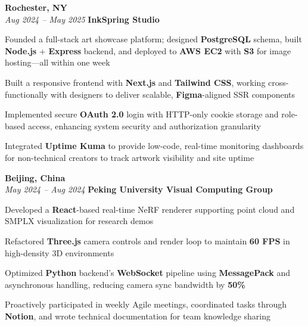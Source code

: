 \begin{twocolentry}{
    \textbf{Rochester, NY} \\
    \textit{Aug 2024 – May 2025}
}{
    \textbf{InkSpring Studio} \\
}
\end{twocolentry}
\begin{onecolentry}
    \begin{highlights}
        \item Founded a full-stack art showcase platform; designed \textbf{PostgreSQL} schema, built \textbf{Node.js} + \textbf{Express} backend, and deployed to \textbf{AWS EC2} with \textbf{S3} for image hosting—all within one week
        \item Built a responsive frontend with \textbf{Next.js} and \textbf{Tailwind CSS}, working cross-functionally with designers to deliver scalable, \textbf{Figma}-aligned SSR components
        \item Implemented secure \textbf{OAuth 2.0} login with HTTP-only cookie storage and role-based access, enhancing system security and authorization granularity
        \item Integrated \textbf{Uptime Kuma} to provide low-code, real-time monitoring dashboards for non-technical creators to track artwork visibility and site uptime
    \end{highlights}
\end{onecolentry}

\vspace{0.2cm}

\begin{twocolentry}{
    \textbf{Beijing, China} \\
    \textit{May 2024 – Aug 2024}
}{
    \textbf{Peking University Visual Computing Group} \\
}
\end{twocolentry}
\begin{onecolentry}
    \begin{highlights}
        \item Developed a \textbf{React}-based real-time NeRF renderer supporting point cloud and SMPLX visualization for research demos
        \item Refactored \textbf{Three.js} camera controls and render loop to maintain \textbf{60 FPS} in high-density 3D environments
        \item Optimized \textbf{Python} backend's \textbf{WebSocket} pipeline using \textbf{MessagePack} and asynchronous handling, reducing camera sync bandwidth by \textbf{50\%}
        \item Proactively participated in weekly Agile meetings, coordinated tasks through \textbf{Notion}, and wrote technical documentation for team knowledge sharing
    \end{highlights}
\end{onecolentry}
